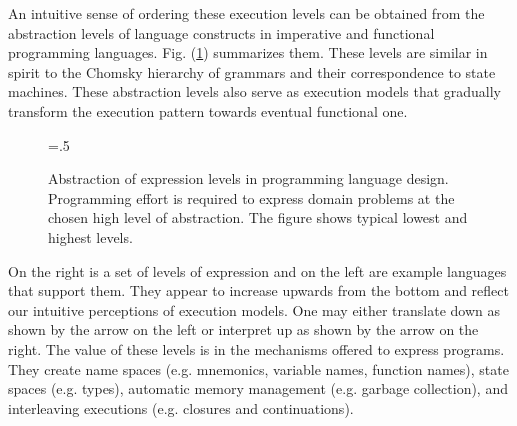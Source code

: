 \documentclass[draft]{article}
\def\fig#1{Fig. (\ref{#1})}
\def\figdir{.}
\begin{document}
An intuitive sense of ordering  these execution levels can be obtained
from the  abstraction levels of language constructs  in imperative and
functional  programming  languages.   \fig{fig:prog:lang:abstractions}
summarizes them.   These levels are  similar in spirit to  the Chomsky
hierarchy  of grammars  and  their correspondence  to state  machines.
These abstraction levels also serve as execution models that gradually
transform the execution pattern towards eventual functional one.
\begin{figure}[t]
  \centering
  \epsfxsize=.5\textwidth
  \epsffile{\figdir/Abstractions-03.eps}
  \caption[Abstraction    of   expression   levels    in   programming
  languages]{Abstraction of expression  levels in programming language
    design.  Programming effort is required to express domain problems
    at the chosen high level of abstraction.  The figure shows typical
    lowest and highest levels.}
  \label{fig:prog:lang:abstractions}
\end{figure}
On the  right is a  set of  levels of expression  and on the  left are
example languages that support  them.  They appear to increase upwards
from  the bottom and  reflect our  intuitive perceptions  of execution
models.  One  may either translate down  as shown by the  arrow on the
left or interpret up as shown by the arrow on the right.  The value of
these levels is  in the mechanisms offered to  express programs.  They
create name spaces (e.g.   mnemonics, variable names, function names),
state spaces (e.g.  types), automatic memory management (e.g.  garbage
collection),   and  interleaving   executions   (e.g.   closures   and
continuations). 
\end{document}
